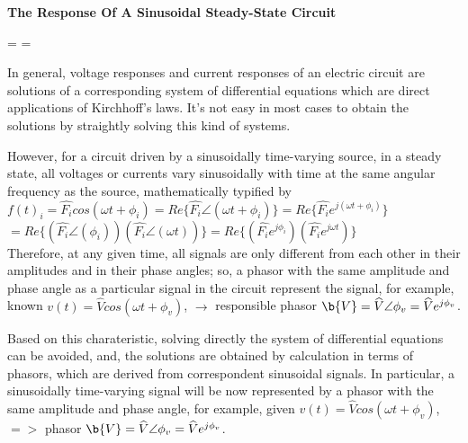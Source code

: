 \documentclass[a4paper,12pt,oneside]{report}
\newenvironment{tree}[4]{
\begin{list}{#1}{\parskip=0in \topsep=0in \itemsep=0in \parsep=0in \partopsep=0in \leftmargin=#2 \rightmargin=#3 \itemindent=#4 \listparindent=\itemindent}
}{\end{list}}
\newenvironment{ssection}[3]{
\framebox{\textbf{#1}} \textbf{#2}
\begin{tree}{#3}{0in}{0in}{\parindent}
}{\end{tree}}
\begin{document}
\begin{ssection}{2}{The Response Of A Sinusoidal Steady-State Circuit}{\textbullet}
\item In general, voltage responses and current responses of an electric circuit are solutions of a corresponding system of  differential equations which are direct applications of Kirchhoff's laws. It's not easy in most cases to obtain the solutions by straightly solving this kind of systems. 
\item However, for a circuit driven by a sinusoidally time-varying source, in a steady state, all voltages or currents vary sinusoidally with time at the same angular frequency as the source, mathematically typified by \\
\indent\qquad$f(t)_{i}=\widehat{F_{i}}cos(\omega t+\phi_{i})=Re\{\widehat{F_{i}}\angle(\omega t+\phi_{i})\}=Re\{\widehat{F_{i}}e^{j(\omega t+\phi_{i})}\}$\\
\indent\qquad{}$=Re\{(\widehat{F_{i}}\angle(\phi_{i}))(\widehat{F_{i}}\angle(\omega t))\}=Re\{(\widehat{F_{i}}e^{j\phi_{i}})(\widehat{F_{i}}e^{j\omega t})\}$\\ \indent
Therefore, at any given time, all signals are only different from each other in their amplitudes and in their phase angles; so, a phasor with the same amplitude and phase angle as a particular signal in the circuit represent the signal, for example, known $v(t)=\widehat{V}cos(\omega t+\phi_{v})$, $\rightarrow$ responsible phasor $\b{V}=\widehat{V}\angle \phi_{v}=\widehat{V}e^{j\phi_{v}}$.
\item Based on this charateristic, solving directly the system of differential equations can be avoided, and, the solutions are obtained by calculation in terms of phasors, which are derived from correspondent sinusoidal signals. In particular, a sinusoidally time-varying signal will be now represented by a phasor with the same amplitude and phase angle, for example, given $v(t)=\widehat{V}cos(\omega t+\phi_{v})$, $=>$ phasor $\b{V}=\widehat{V}\angle \phi_{v}=\widehat{V}e^{j\phi_{v}}$.
\end{ssection}
\end{document}

